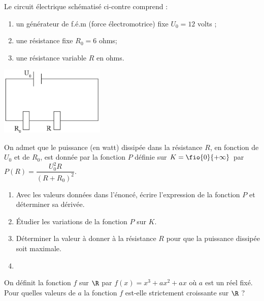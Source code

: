 \documentclass[a4paper,11pt,exos]{nsi} %
\begin{document}
\exo{}
\begin{minipage}{12cm}
	Le circuit électrique schématisé ci-contre comprend :
	\begin{enumerate}[label=\textbullet]
		\item 	un générateur de f.é.m (force électromotrice) fixe $U_0=12$ volts ;
		\item 	une résistance fixe $R_0=6$ ohms;
		\item	une résistance variable $R$ en ohms.	
	\end{enumerate}
\end{minipage}
\begin{minipage}{5cm}
	\includegraphics[width=5cm]{circuit}\\[1em]
\end{minipage}
On admet que le puissance (en watt) dissipée dans la résistance $R$, en fonction de $U_0$ et de $R_0$, est donnée par la fonction $P$ définie sur $K=\fio{0}{+\infty}$ par $P(R)=\dfrac{U_0 ^2R}{\left(R+R_0\right)^2}$.
\begin{enumerate}
	\item 	Avec les valeurs données dans l'énoncé, écrire l'expression de la fonction $P$ et déterminer sa dérivée.
	\item 	\'Etudier les variations de la fonction $P$ sur $K$.
	\item	Déterminer la valeur à donner à la résistance $R$ pour que la puissance dissipée soit maximale.
	\item	{}
\end{enumerate}


\exo{}
On définit la fonction $f$ sur $\R$ par $f(x)=x^3+ax^2+ax$ où $a$ est un réel fixé.\\
Pour quelles valeurs de $a$ la fonction $f$ est-elle strictement croissante sur $\R$ ?\\
\end{document}
